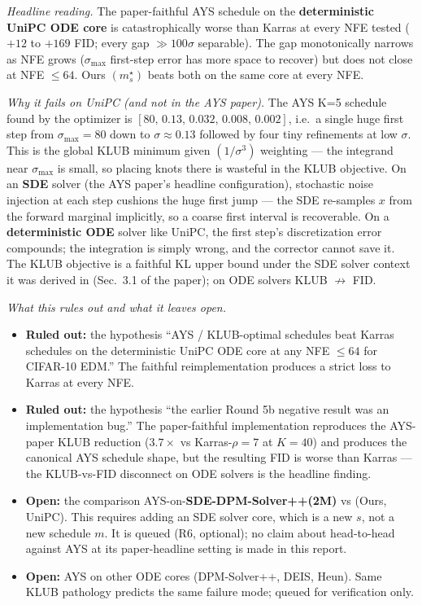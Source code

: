 \documentclass[11pt]{article}
\begin{document}
\noindent
\emph{Headline reading.} The paper-faithful AYS schedule on the
\textbf{deterministic UniPC ODE core} is catastrophically worse than
Karras at every NFE tested (\(+12\) to \(+169\) FID; every gap
\(\gg 100\sigma\) separable). The gap monotonically narrows as NFE
grows (\(\sigma_{\max}\) first-step error has more space to recover)
but does not close at NFE \(\le 64\). Ours \((m_s^\star)\) beats both
on the same core at every NFE.

\emph{Why it fails on UniPC (and not in the AYS paper).} The AYS K=5
schedule found by the optimizer is
\([80,\,0.13,\,0.032,\,0.008,\,0.002]\), i.e.\ a single huge first step
from \(\sigma_{\max}=80\) down to \(\sigma\!\approx\!0.13\) followed
by four tiny refinements at low \(\sigma\). This is the global KLUB
minimum given \((1/\sigma^3)\) weighting --- the integrand near
\(\sigma_{\max}\) is small, so placing knots there is wasteful in the
KLUB objective. On an \textbf{SDE} solver (the AYS paper's headline
configuration), stochastic noise injection at each step cushions the
huge first jump --- the SDE re-samples \(x\) from the forward marginal
implicitly, so a coarse first interval is recoverable. On a
\textbf{deterministic ODE} solver like UniPC, the first step's
discretization error compounds; the integration is simply wrong, and
the corrector cannot save it. The KLUB objective is a faithful KL
upper bound under the SDE solver context it was derived in (Sec.~3.1
of the paper); on ODE solvers KLUB \(\not\to\) FID.

\emph{What this rules out and what it leaves open.}
\begin{itemize}\itemsep0pt
\item \textbf{Ruled out:} the hypothesis ``AYS / KLUB-optimal schedules
beat Karras schedules on the deterministic UniPC ODE core at any NFE
\(\le 64\) for CIFAR-10 EDM.'' The faithful reimplementation produces
a strict loss to Karras at every NFE.
\item \textbf{Ruled out:} the hypothesis ``the earlier Round 5b
negative result was an implementation bug.'' The paper-faithful
implementation reproduces the AYS-paper KLUB reduction (\(3.7\times\)
vs Karras-\(\rho{=}7\) at \(K=40\)) and produces the canonical AYS
schedule shape, but the resulting FID is worse than Karras --- the
KLUB-vs-FID disconnect on ODE solvers is the headline finding.
\item \textbf{Open:} the comparison AYS-on-\textbf{SDE-DPM-Solver++(2M)}
vs (Ours, UniPC). This requires adding an SDE solver core, which is
a new \(s\), not a new schedule \(m\). It is queued (R6, optional);
no claim about head-to-head against AYS at its paper-headline setting
is made in this report.
\item \textbf{Open:} AYS on other ODE cores (DPM-Solver++, DEIS,
Heun). Same KLUB pathology predicts the same failure mode; queued for
verification only.
\end{itemize}
\end{document}
